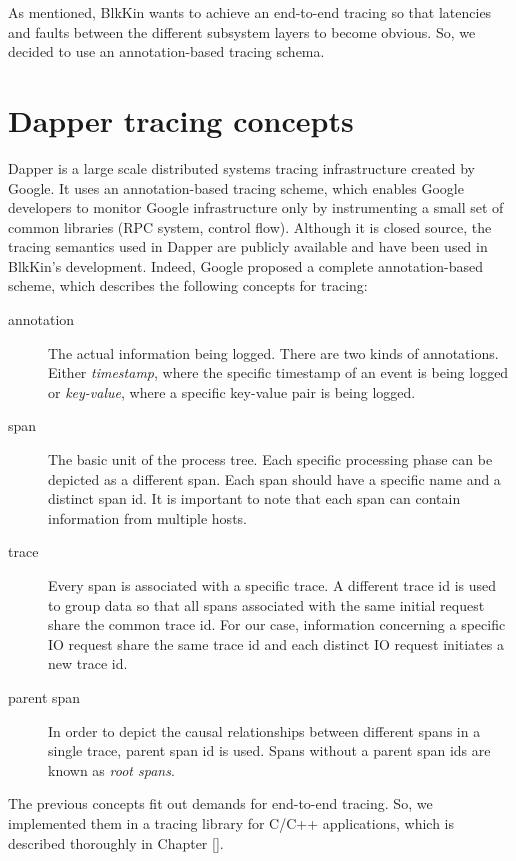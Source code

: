 As mentioned, BlkKin wants to achieve an end-to-end tracing so that latencies
and faults between the different subsystem layers to become obvious. So, we
decided to use an annotation-based tracing schema.

\section{Dapper tracing concepts}\label{sec:dapper}

Dapper\cite{dapper} is a large scale distributed systems tracing infrastructure
created by Google. It uses an annotation-based tracing scheme, which enables
Google developers to monitor Google infrastructure only by instrumenting a small
set of common libraries (RPC system, control flow). Although it is closed
source, the tracing semantics used in Dapper are publicly available and have
been used in BlkKin's development. Indeed, Google proposed a complete
annotation-based scheme, which describes the following concepts for tracing:

\begin{description}
\item[annotation]
The actual information being logged. There are two kinds of annotations. Either
\emph{timestamp}, where the specific timestamp of an event is being logged or
\emph{key-value}, where a specific key-value pair is being logged.
\item[span]
The basic unit of the process tree. Each specific processing phase can be
depicted as a different span. Each span should have a specific name and a
distinct span id. It is important to note that each span can contain information
from multiple hosts.
\item[trace]
Every span is associated with a specific trace. A different trace id is used to
group data so that all spans associated with the same initial request share the
common trace id. For our case, information concerning a specific IO request
share the same trace id and each distinct IO request initiates a new trace id.
\item[parent span]
In order to depict the causal relationships between different spans in a single
trace, parent span id is used. Spans without a parent span ids are  known as
\emph{root spans}.
\end{description}

The previous concepts fit out demands for end-to-end tracing. So, we implemented
them in a tracing library for C/C++ applications, which is described thoroughly
in Chapter \ref{}.
 
